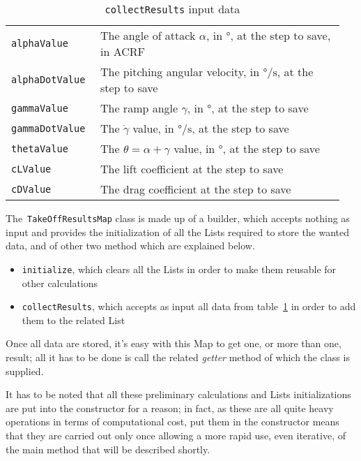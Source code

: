 \begin{table}[!t]
{\begin{tabular}{p{0.25\linewidth}p{0.7\linewidth}}
\lstinline[language=Java]!alphaValue! & The angle of attack $\alpha$, in  $\si{\degree}$, at the step to save, in \gls{ACRF} \\ [0.2cm]
\lstinline[language=Java]!alphaDotValue! & The pitching angular velocity, in  $\si{\degree\per\second}$, at the step to save \\ [0.2cm]
\lstinline[language=Java]!gammaValue! & The ramp angle $\gamma$, in  $\si{\degree}$, at the step to save  \\ [0.2cm]
\lstinline[language=Java]!gammaDotValue! & The $\dot\gamma$ value, in  $\si{\degree\per\second}$, at the step to save \\ [0.2cm]
\lstinline[language=Java]!thetaValue! & The $\theta=\alpha+\gamma$ value, in  $\si{\degree}$, at the step to save \\ [0.2cm]
\lstinline[language=Java]!cLValue! & The lift coefficient at the step to save \\ [0.2cm]
\lstinline[language=Java]!cDValue! & The drag coefficient at the step to save \\ 
\bottomrule
\end{tabular}
}
\caption{\lstinline[language=Java]!collectResults! input data}
\label{table:TakeOffMapInput}
\end{table}

\bigskip
\noindent
The~\lstinline[language=Java]!TakeOffResultsMap! class is made up of a builder, which accepts nothing as input and provides the initialization of all the \gls{List}s required to store the wanted data, and of other two method which are explained below.
%
\begin{itemize}
\item \lstinline[language=Java]!initialize!, which clears all the \gls{List}s in order to make them reusable for other calculations
\item \lstinline[language=Java]!collectResults!, which accepts as input all data from table~\ref{table:TakeOffMapInput} in order to add them to the related \gls{List}
\end{itemize}
%
Once all data are stored, it's easy with this \gls{Map} to get one, or more than one, result; all it has to be done is call the related \emph{getter} method of which the class is supplied. 

\bigskip
\noindent
It has to be noted that all these preliminary calculations and \gls{List}s initializations are put into the constructor for a reason; in fact, as these are all quite heavy operations in terms of computational cost, put them in the constructor means that they are carried out only once allowing a more rapid use, even iterative, of the main method that will be described shortly.

